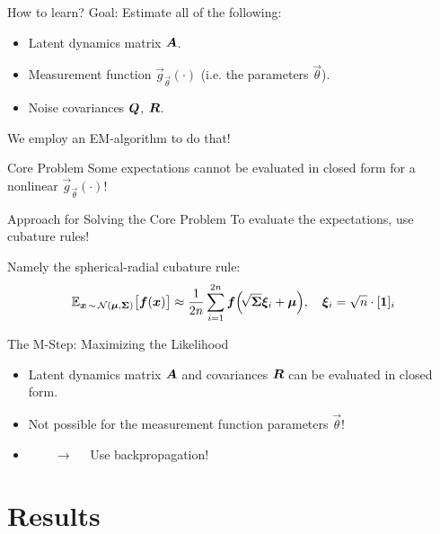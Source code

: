 \documentclass[
	aspectratio=43,
	color={accentcolor=1c},
	logo=false,
	colorframetitle=true,
]{tudabeamer}
\begin{document}
	\begin{frame}{How to learn?}
		Goal: Estimate all of the following:
		\begin{itemize}
			\item Latent dynamics matrix \( \bm{A} \).
			\item Measurement function \( \vec{g}_{\vec{\theta}}(\cdot) \) (i.e. the parameters \( \vec{\theta} \)).
			\item Noise covariances \(\bm{Q}\), \(\bm{R}\).
		\end{itemize}
		We employ an EM-algorithm to do that!

		\begin{alertblock}{Core Problem}
			Some expectations cannot be evaluated in closed form for a nonlinear \( \vec{g}_{\vec{\theta}}(\cdot) \)!
		\end{alertblock}
	\end{frame}

	\begin{frame}{Approach for Solving the Core Problem}
		To evaluate the expectations, use cubature rules!

		Namely the spherical-radial cubature rule:
		\begin{align*}
			\mathbb{E}_{\bm{x} \,\sim\, \mathcal{N}(\bm{\mu}, \bm{\Sigma})}\big[ \bm{f}(\bm{x}) \big] \approx \frac{1}{2n} \sum_{i = 1}^{2n} \bm{f}\Big(\! \sqrt{\bm{\Sigma}} \bm{\xi}_i + \bm{\mu} \Big),\quad \bm{\xi}_i = \sqrt{n} \cdot [\bm{1}]_i
		\end{align*}
	\end{frame}

	\begin{frame}{The M-Step: Maximizing the Likelihood}
		\begin{itemize}
			\item Latent dynamics matrix \(\bm{A}\) and covariances \(\bm{R}\) can be evaluated in closed form.
			\item Not possible for the measurement function parameters \( \vec{\theta} \)!
			\item[] \(\qquad\longrightarrow\quad\) Use backpropagation!
		\end{itemize}
	\end{frame}

	\section{Results}
\end{document}
